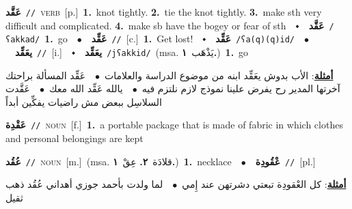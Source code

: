 \documentclass[10pt,a4paper,twoside]{article} %
\begin{document}
\begin{multicols}{2}
{\setlength\topsep{0pt}\textbf{\foreignlanguage{arabic}{عَقَّد}}\ {\color{gray}\texttt{//}\color{black}}\ \textsc{verb}\ [p.]\ \textbf{1.}~knot tightly.  \textbf{2.}~tie the knot tightly.  \textbf{3.}~make sth very difficult and complicated.  \textbf{4.}~make sb have the bogey or fear of sth\ \ $\smblkdiamond$\ \ \setlength\topsep{0pt}\textbf{\foreignlanguage{arabic}{عَقَّد}}\ {\color{gray}\texttt{/ʕakkad/}\color{black}}\ \textbf{1.}~go\ \ $\bullet$\ \ \setlength\topsep{0pt}\textbf{\foreignlanguage{arabic}{عَقِّد}}\ {\color{gray}\texttt{//}\color{black}}\ [c.]\ \textbf{1.}~Get lost!\ \ $\smblkdiamond$\ \ \setlength\topsep{0pt}\textbf{\foreignlanguage{arabic}{عَقِّد}}\ {\color{gray}\texttt{/ʕa(q)(q)id/}\color{black}}\ \ $\bullet$\ \ \setlength\topsep{0pt}\textbf{\foreignlanguage{arabic}{يعَقِّد}}\ {\color{gray}\texttt{//}\color{black}}\ [i.]\ \ $\smblkdiamond$\ \ \setlength\topsep{0pt}\textbf{\foreignlanguage{arabic}{يعَقِّد}}\ {\color{gray}\texttt{/jʕakkid/}\color{black}}\ \color{gray}(msa. \foreignlanguage{arabic}{يَذْهَب}~\foreignlanguage{arabic}{\textbf{١.}})\color{black}\ \textbf{1.}~go\  \begin{flushright}\color{gray}\foreignlanguage{arabic}{\textbf{\underline{\foreignlanguage{arabic}{أمثلة}}}: الأب بدوش يعَقِّد ابنه من موضوع الدراسة والعلامات\ $\bullet$\ \  عَقِّد المسألة براحتك آخرتها المدير رح يفرض علينا نموذج لازم نلتزم فيه\ $\bullet$\ \  يالله عَقِّد الله معك\ $\bullet$\ \  عَقَّدت السلاسِل ببعض مش راضيات يفكِّين أبداً}\end{flushright}\color{black}} \vspace{2mm}

{\setlength\topsep{0pt}\textbf{\foreignlanguage{arabic}{عَقْدِة}}\ {\color{gray}\texttt{//}\color{black}}\ \textsc{noun}\ [f.]\ \textbf{1.}~a portable package that is made of fabric in which clothes and personal belongings are kept\ } \vspace{2mm}

{\setlength\topsep{0pt}\textbf{\foreignlanguage{arabic}{عُقُد}}\ {\color{gray}\texttt{//}\color{black}}\ \textsc{noun}\ [m.]\ \color{gray}(msa. \foreignlanguage{arabic}{قلادَة}~\foreignlanguage{arabic}{\textbf{٢.}}  \foreignlanguage{arabic}{عِقْ}~\foreignlanguage{arabic}{\textbf{١.}})\color{black}\ \textbf{1.}~necklace\ \ $\bullet$\ \ \setlength\topsep{0pt}\textbf{\foreignlanguage{arabic}{عْقُودِة}}\ {\color{gray}\texttt{//}\color{black}}\ [pl.]\  \begin{flushright}\color{gray}\foreignlanguage{arabic}{\textbf{\underline{\foreignlanguage{arabic}{أمثلة}}}: كل العْقودِة تبعتي دشرتهن عند إِمي\ $\bullet$\ \  لما ولدت بأحمد جوزي أهداني عُقُد ذهب ثقيل}\end{flushright}\color{black}} \vspace{2mm}


\end{multicols}
\end{document}
